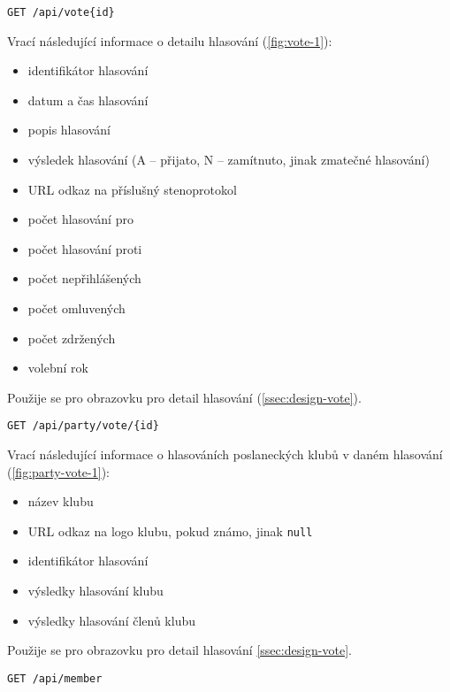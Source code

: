 \begin{lstlisting}[label={lst:endpoint-vote}] 
GET /api/vote{id}
\end{lstlisting}

\noindent Vrací následující informace o detailu hlasování (\ref{fig:vote-1}):
\begin{itemize}
	\item identifikátor hlasování
	\item datum a čas hlasování
	\item popis hlasování
	\item výsledek hlasování (A -- přijato, N -- zamítnuto, jinak zmatečné hlasování)
	\item URL odkaz na příslušný stenoprotokol
	\item počet hlasování pro
	\item počet hlasování proti
	\item počet nepřihlášených
	\item počet omluvených
	\item počet zdržených
	\item volební rok
\end{itemize}

\noindent Použije se pro obrazovku pro detail hlasování (\ref{ssec:design-vote}).

\vspace{10px}

\begin{lstlisting}[label={lst:endpoint-party-votes}] 
GET /api/party/vote/{id}
\end{lstlisting}

\noindent Vrací následující informace o hlasováních poslaneckých klubů v daném hlasování (\ref{fig:party-vote-1}):

\begin{itemize}
	\item název klubu
	\item URL odkaz na logo klubu, pokud známo, jinak \lstinline|null|
	\item identifikátor hlasování
	\item výsledky hlasování klubu
	\item výsledky hlasování členů klubu
\end{itemize}

\noindent Použije se pro obrazovku pro detail hlasování \ref{ssec:design-vote}.

\vspace{10px}

\begin{lstlisting}[label={lst:endpoint-members}] 
GET /api/member
\end{lstlisting}

